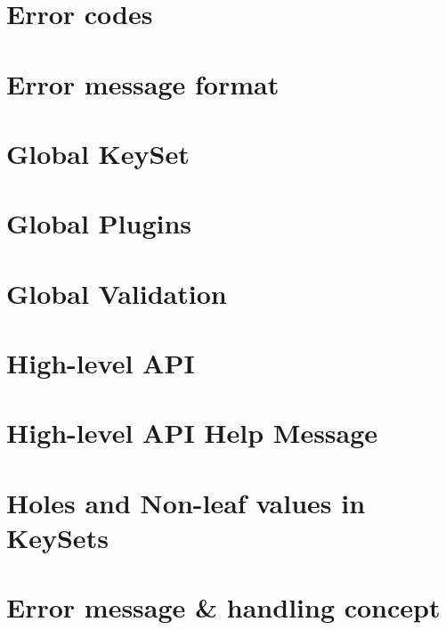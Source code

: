 \documentclass[twoside]{book}
\newcommand{\+}{\discretionary{\mbox{\scriptsize$\hookleftarrow$}}{}{}}
\begin{document}
\chapter{Error codes}
\label{doc_decisions_error_codes_md}

\chapter{Error message format}
\label{doc_decisions_error_message_format_md}

\chapter{Global Key\+Set}
\label{doc_decisions_global_keyset_md}

\chapter{Global Plugins}
\label{doc_decisions_global_plugins_md}

\chapter{Global Validation}
\label{doc_decisions_global_validation_md}

\chapter{High-\/level A\+PI}
\label{doc_decisions_high_level_api_md}

\chapter{High-\/level A\+PI Help Message}
\label{doc_decisions_highlevel_help_message_md}

\chapter{Holes and Non-\/leaf values in Key\+Sets}
\label{doc_decisions_holes_md}

\chapter{Error message \& handling concept}
\label{doc_decisions_ingroup_removal_md}

\end{document}
